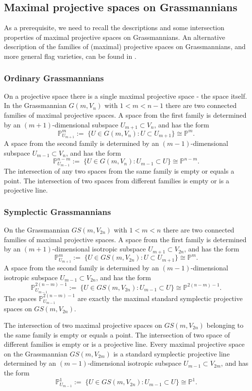 \documentclass[12pt]{amsart}
\def\PP {{\mathbb P}}     %
\begin{document}
\subsection{Maximal projective spaces on Grassmannians}\label{Sec Lin Spaces}

As a prerequisite, we need to recall the descriptions and some intersection properties of maximal projective spaces on Grassmannians. An alternative description of the families of (maximal) projective spaces on Grassmannians, and more general flag varieties, can be found in \cite{Lands-Mani-2003-ProjGeo}.

\subsubsection{Ordinary Grassmannians} On a projective space there is a single maximal projective space - the space itself. In the Grassmannian $G(m,V_n)$ with $1<m<n-1$ there are two connected families of maximal projective spaces. A space from the first family is determined by an $(m+1)$-dimensional subspace $U_{m+1}\subset V_n$, and has the form
$$
\PP^{m}_{U_{m+1}} :=\;\{ U\in G(m,V_n): U\subset U_{m+1} \} \cong \PP^{m}.
$$
A space from the second family is determined by an $(m-1)$-dimensional subspace $U_{m-1}\subset V_n$, and has the form
$$
\PP^{n-m}_{U_{m-1}} :=\;\{ U\in G(m,V_n): U_{m-1}\subset U \} \cong \PP^{n-m}.
$$
The intersection of any two spaces from the same family is empty or equals a point. The intersection of two spaces from different families is empty or is a projective line.


\subsubsection{Symplectic Grassmannians}\label{Sec max proj GS} On the Grassmannian $GS(m,V_{2n})$ with $1<m< n$ there are two connected families of maximal projective spaces. A space from the first family is determined by an $(m+1)$-dimensional isotropic subspace $U_{m+1}\subset V_{2n}$, and has the form
$$
\PP^{m}_{U_{m+1}} :=\;\{ U\in GS(m,V_{2n}): U\subset U_{m+1} \} \cong \PP^{m}.
$$
A space from the second family is determined by an $(m-1)$-dimensional isotropic subspace $U_{m-1}\subset V_{2n}$, and has the form
$$
\PP^{2(n-m)-1}_{U_{m-1}} :=\;\{ U\in GS(m,V_{2n}): U_{m-1}\subset U \} \cong \PP^{2(n-m)-1}.
$$
The spaces $\PP^{2(n-m)-1}_{U_{m-1}}$ are exactly the maximal standard symplectic projective spaces on $GS(m,V_{2n})$.

The intersection of two maximal projective spaces on $GS(m,V_{2n})$ belonging to the same family is empty or equals a point. The intersection of two space of different families is empty or is a projective line. Every maximal projective space on the Grassmannian $GS(m,V_{2m})$ is a standard symplectic projective line determined by an $(m-1)$-dimensional isotropic subspace $U_{m-1}\subset V_{2m}$, and has the form 
$$
\PP^{1}_{U_{m-1}} :=\;\{ U\in GS(m,V_{2n}): U_{m-1}\subset U \} \cong \PP^1.
$$
\end{document}
